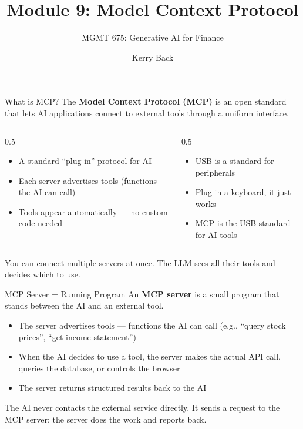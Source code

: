 \documentclass[aspectratio=169]{beamer}
\subtitle{MGMT 675: Generative AI for Finance}
\title{Module 9: Model Context Protocol}
\author{Kerry Back}
\date{}
\begin{document}
\maketitle

\begin{frame}{What is MCP?}
The \textbf{Model Context Protocol (MCP)} is an open standard that lets AI applications connect to external tools through a uniform interface.
\vspace{0.3cm}
\begin{columns}[T]
\begin{column}{0.5\textwidth}
\begin{shadedbox}[title=\textbf{The Idea}]
\begin{itemize}\small
  \item A standard ``plug-in'' protocol for AI
  \item Each server advertises tools (functions the AI can call)
  \item Tools appear automatically --- no custom code needed
\end{itemize}
\end{shadedbox}
\end{column}
\begin{column}{0.5\textwidth}
\begin{shadedbox}[title=\textbf{Analogy}]
\begin{itemize}\small
  \item USB is a standard for peripherals
  \item Plug in a keyboard, it just works
  \item MCP is the USB standard for AI tools
\end{itemize}
\end{shadedbox}
\end{column}
\end{columns}
\vspace{0.3cm}
You can connect multiple servers at once.  The LLM sees all their tools and decides which to use.
\end{frame}

\begin{frame}{MCP Server = Running Program}
An \textbf{MCP server} is a small program that stands between the AI and an external tool.
\vspace{0.3cm}
\begin{itemize}
  \item The server \alert{advertises tools} --- functions the AI can call (e.g., ``query stock prices'', ``get income statement'')
  \item When the AI decides to use a tool, the server \alert{makes the actual API call}, queries the database, or controls the browser
  \item The server returns structured results back to the AI
\end{itemize}
\vspace{0.3cm}
The AI never contacts the external service directly.  It sends a request to the MCP server; the server does the work and reports back.
\end{frame}
\end{document}
